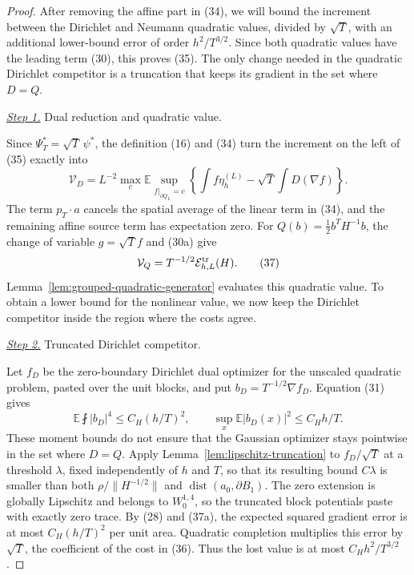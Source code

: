 \documentclass{aomart}
\theoremstyle{definition}
\newcommand{\1}{\mathbf 1}
\begin{document}
\begin{proof}
After removing the affine part in (34), we will bound the increment
between the Dirichlet and Neumann quadratic values, divided by
$\sqrt T$, with an additional lower-bound error of order
$h^2/T^{3/2}$.  Since both quadratic values have the leading term
(30), this proves (35).  The only change needed in the quadratic
Dirichlet competitor is a truncation that keeps its gradient in the
set where $D=Q$.

\smallskip\noindent
\underline{\textit{Step 1.}} Dual reduction and quadratic value.

Since $\Psi_ T^*=\sqrt T\,\psi^*$, the definition (16) and (34) turn
the increment on the left of (35) exactly into
\begin{equation}
\mathcal V_ D=L^{-2}\max_ c\mathbb E\sup_ {f|_ {\partial Q_ L}=c}
\left\{\int f\eta_ h^{(L)}-\sqrt T\int D(\nabla f)\right\}.
\tag{36}
\end{equation}
The term $p_ T\cdot a$ cancels the spatial average of the linear term
in (34), and the remaining affine source term has expectation zero.  For
$Q(b)=\frac12b^TH^{-1}b$, the change of variable
$g=\sqrt T f$ and (30a) give
\begin{equation}
\mathcal V_ Q=T^{-1/2}\mathcal E^{\rm tr}_ {h,L}(H).
\tag{37}
\end{equation}
Lemma~\ref{lem:grouped-quadratic-generator} evaluates this quadratic
value.  To obtain a lower bound for the nonlinear value, we now keep
the Dirichlet competitor inside the region where the costs agree.

\smallskip\noindent
\underline{\textit{Step 2.}} Truncated Dirichlet competitor.

Let $f_D$ be the zero-boundary Dirichlet dual optimizer for the
unscaled quadratic problem, pasted over the unit blocks, and put
$b_D=T^{-1/2}\nabla f_D$.  Equation (31) gives
\begin{equation}
\mathbb E\fint|b_ D|^4\leq C_ H(h/T)^2,\qquad
\sup_ x\mathbb E|b_ D(x)|^2\leq C_ Hh/T.
\tag{37a}
\end{equation}
These moment bounds do not ensure that the Gaussian optimizer stays
pointwise in the set where $D=Q$.  Apply
Lemma~\ref{lem:lipschitz-truncation} to $f_ D/\sqrt T$ at a threshold
$\lambda$, fixed independently of $h$ and $T$, so that its resulting
bound $C\lambda$ is
smaller than both
$\rho/\|H^{-1/2}\|$ and
$\operatorname {dist}(a_ 0,\partial B_ 1)$.  The zero extension is
globally Lipschitz and belongs to $W^{1,4}_ 0$, so the truncated block
potentials paste with exactly zero trace.  By (28) and (37a), the
expected squared gradient error is at most $C_H(h/T)^2$ per unit
area.  Quadratic completion multiplies this error by $\sqrt T$,
the coefficient of the cost in (36).  Thus the lost value is at most
$C_Hh^2/T^{3/2}$.


\end{proof}
\end{document}
